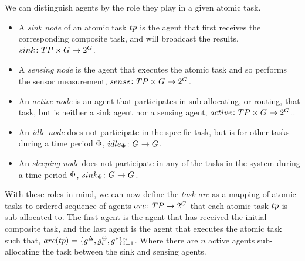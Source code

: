 We can distinguish agents by the role they play in a given atomic task.
\begin{itemize}
	\item A \textit{sink node} of an atomic task $\varAtomicTask{}{}$ is the agent that first receives the corresponding composite task, and will broadcast the results, $\formalSinkRole{}{}$.
	\item A \textit{sensing node} is the agent that executes the atomic task and so performs the sensor measurement, $\formalSenseRole{}{}$.
	\item An \textit{active node} is an agent that participates in sub-allocating, or routing, that task, but is neither a sink agent nor a sensing agent, $\formalActiveRole{}{}$..
	\item An \textit{idle node} does not participate in the specific task, but is for other tasks during a time period $\Phi$, $\formalIdleRole{}{}$.
	\item An \textit{sleeping node} does not participate in any of the tasks in the system during a time period $\Phi$, $\formalSleepRole{}{}$.
\end{itemize}

With these roles in mind, we can now define the \textit{task arc} as a mapping of atomic tasks to ordered sequence of agents $\formalTaskArc{}{}$ that each atomic task $\varAtomicTask{}{}$ is sub-allocated to. The first agent is the agent that has received the initial composite task, and the last agent is the agent that executes the atomic task such that, 
$\functionTaskArc{}{} = \lbrace \varSinkAgent{}{}, \varActiveAgent{i}{}, \varSensingAgent{}{} \rbrace_{i=1}^{n}$. Where there are $n$ active agents sub-allocating the task between the sink and sensing agents.



